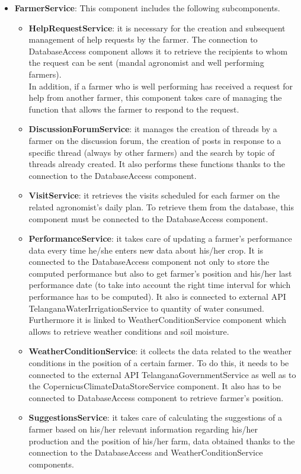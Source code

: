 \begin{itemize}
\item \textbf{FarmerService}: This component includes the following subcomponents.

\begin{itemize}
    \item \textbf{HelpRequestService}: it is necessary for the creation and subsequent management of help requests by the farmer. The connection to DatabaseAccess component allows it to retrieve the recipients to whom the request can be sent (mandal agronomist and well performing farmers).\\
    In addition, if a farmer who is well performing has received a request for help from another farmer, this component takes care of managing the function that allows the farmer to respond to the request.
    \item \textbf{DiscussionForumService}: it manages the creation of threads by a farmer on the discussion forum, the creation of posts in response to a specific thread (always by other farmers) and the search by topic of threads already created. It also performs these functions thanks to the connection to the DatabaseAccess component.
    \item \textbf{VisitService}: it retrieves the visits scheduled for each farmer on the related agronomist's daily plan.
    To retrieve them from the database, this component must be connected to the DatabaseAccess component.
    \item \textbf{PerformanceService}: it takes care of updating a farmer's performance data every time he/she enters new data about his/her crop. It is connected to the DatabaseAccess component not only to store the computed performance but also to get farmer's position and his/her last performance date (to take into account the right time interval for which performance has to be computed).
    It also is connected to external API TelanganaWaterIrrigationService to quantity of water consumed. Furthermore it is linked to WeatherConditionService component which allows to retrieve weather conditions and soil moisture.
    \item \textbf{WeatherConditionService}: it collects the data related to the weather conditions in the position of a certain farmer. To do this, it needs to be connected to the external API TelanganaGovernmentService as well as to the CopernicusClimateDataStoreService component. It also has to be connected to DatabaseAccess component to retrieve farmer's position.
    \item \textbf{SuggestionsService}: it takes care of calculating the suggestions of a farmer based on his/her relevant information regarding his/her production and the position of his/her farm, data obtained thanks to the connection to the DatabaseAccess and WeatherConditionService components.
\end{itemize}


\end{itemize}
